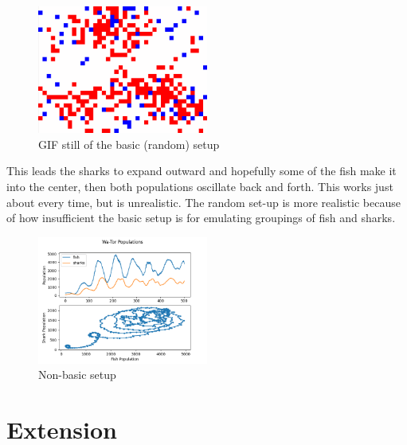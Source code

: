 \documentclass[12pt]{iopart} %
\begin{document}
\begin{figure}[h!tbp]
  \begin{center}
  \item[]\includegraphics[width=0.5\textwidth]{figure29.png}
  \caption{\label{fig:figure29}
  GIF still of the basic (random) setup
  }
  \end{center}
\end{figure}

This leads the sharks to expand outward and hopefully some of the fish make it into the center, then both populations oscillate back and forth. 
This works just about every time, but is unrealistic. 
The random set-up is more realistic because of how insufficient the basic setup is for emulating groupings of fish and sharks.

\begin{figure}[h!tbp]
  \begin{center}
  \item[]\includegraphics[width=0.5\textwidth]{figure30.png}
  \caption{\label{fig:figure30}
  Non-basic setup
  }
  \end{center}
\end{figure}

\pagebreak

\section{Extension}
\end{document}
